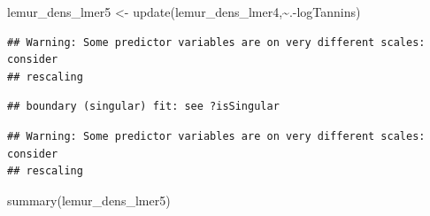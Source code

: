 \documentclass[
  12pt,
]{article}
\newenvironment{Shaded}{\begin{snugshade}}{\end{snugshade}}
\newcommand{\FunctionTok}[1]{\textcolor[rgb]{0.00,0.00,0.00}{#1}}
\newcommand{\NormalTok}[1]{#1}
\newcommand{\OtherTok}[1]{\textcolor[rgb]{0.56,0.35,0.01}{#1}}
\newcommand{\SpecialCharTok}[1]{\textcolor[rgb]{0.00,0.00,0.00}{#1}}
\begin{document}
\begin{Shaded}
\begin{Highlighting}[]
\NormalTok{lemur\_dens\_lmer5 }\OtherTok{\textless{}{-}} \FunctionTok{update}\NormalTok{(lemur\_dens\_lmer4,}\SpecialCharTok{\textasciitilde{}}\NormalTok{.}\SpecialCharTok{{-}}\NormalTok{logTannins)}
\end{Highlighting}
\end{Shaded}

\begin{verbatim}
## Warning: Some predictor variables are on very different scales: consider
## rescaling
\end{verbatim}

\begin{verbatim}
## boundary (singular) fit: see ?isSingular
\end{verbatim}

\begin{verbatim}
## Warning: Some predictor variables are on very different scales: consider
## rescaling
\end{verbatim}

\begin{Shaded}
\begin{Highlighting}[]
\FunctionTok{summary}\NormalTok{(lemur\_dens\_lmer5)}
\end{Highlighting}
\end{Shaded}
\end{document}
